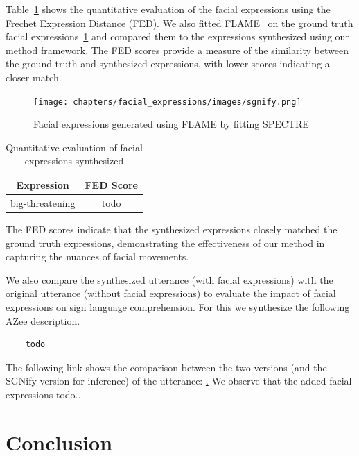 \documentclass[../../main]{subfiles}
\begin{document}
Table~\ref{tab:facial_expressions_quantitative} shows the quantitative evaluation of the facial expressions using the Frechet Expression Distance (FED). We also fitted FLAME~\cite{FLAME} on the ground truth facial expressions~\ref{ch:facial_expressions:fig:spectre} and compared them to the expressions synthesized using our method framework. The FED scores provide a measure of the similarity between the ground truth and synthesized expressions, with lower scores indicating a closer match.

\begin{figure}
    \centering
    \texttt{[image: chapters/facial\_expressions/images/sgnify.png]}
    \caption{Facial expressions generated using FLAME by fitting SPECTRE}
    \label{ch:facial_expressions:fig:spectre}
\end{figure}

\begin{table}
    \centering
    \begin{tabular}{|c|c|}
        \hline
        \textbf{Expression} & \textbf{FED Score} \\
        \hline
        big-threatening & todo \\
        \hline
    \end{tabular}
    \caption{Quantitative evaluation of facial expressions synthesized}
    \label{tab:facial_expressions_quantitative}
\end{table}

The FED scores indicate that the synthesized expressions closely matched the ground truth expressions, demonstrating the effectiveness of our method in capturing the nuances of facial movements.

We also compare the synthesized utterance (with facial expressions) with the original utterance (without facial expressions) to evaluate the impact of facial expressions on sign language comprehension. For this we synthesize the following AZee description.

\begin{verbatim}    
    todo
\end{verbatim}

The following link shows the comparison between the two versions (and the SGNify version for inference) of the utterance: \href{todo}. We observe that the added facial expressions todo...

\section{Conclusion}
\label{ch:facial_expressions:conclusion}
\end{document}
